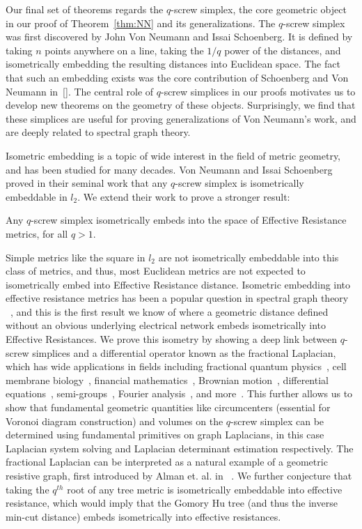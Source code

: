Our final set of theorems regards the $q$-screw simplex, the core geometric
object in our proof of Theorem~\ref{thm:NN} and its generalizations. The
$q$-screw simplex was first discovered by John Von Neumann and Issai
Schoenberg. It is defined by taking $n$ points anywhere on a line, taking
the $1/q$ power of the distances, and isometrically embedding the resulting
distances into Euclidean space. The fact that such an embedding exists was
the core contribution of Schoenberg and Von Neumann in~\ref{}. The central
role of $q$-screw simplices in our proofs motivates us to develop new
theorems on the geometry of these objects. Surprisingly, we find that these
simplices are useful for proving generalizations of Von Neumann's work, and
are deeply related to spectral graph theory.

Isometric embedding is a topic of wide interest in the field of metric
geometry, and has been studied for many decades. Von Neumann and Issai
Schoenberg proved in their seminal work that any $q$-screw simplex is
isometrically embeddable in $l_2$. We extend their work to prove a stronger
result: 
\begin{theorem}
Any $q$-screw simplex isometrically embeds into the space of
Effective Resistance metrics, for all $q>1$.
\end{theorem}
Simple metrics like the square in $l_2$ are
not isometrically embeddable into this class of metrics, and thus, most
Euclidean metrics are not expected to isometrically embed into Effective
Resistance distance. Isometric embedding into effective resistance metrics
has been a popular question in spectral graph theory ~\cite{}, and this is
the first result we know of where a geometric distance defined without an
obvious underlying electrical network embeds isometrically into Effective
Resistances. We prove this isometry by showing a deep link between
$q$-screw simplices and a differential operator known as the fractional
Laplacian, which has wide applications in fields including fractional
quantum physics~\cite{}, cell membrane biology~\cite{}, financial
mathematics~\cite{}, Brownian motion~\cite{}, differential
equations~\cite{}, semi-groups~\cite{}, Fourier analysis~\cite{}, and
more~\cite{}. This further allows us to show that fundamental geometric
quantities like circumcenters (essential for Voronoi diagram construction)
and volumes on the $q$-screw simplex can be determined using fundamental
primitives on graph Laplacians, in this case Laplacian system solving and
Laplacian determinant estimation respectively. The fractional Laplacian can
be interpreted as a natural example of a geometric resistive graph, first
introduced by Alman et. al. in ~\cite{}. We further conjecture that taking
the $q^{th}$ root of any tree metric is isometrically embeddable into
effective resistance, which would imply that the Gomory Hu tree (and thus
the inverse min-cut distance) embeds isometrically into effective
resistances.

